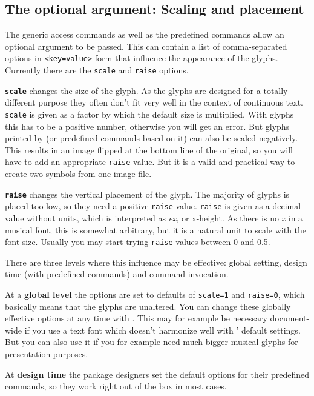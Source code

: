 \documentclass{article}
\begin{document}
\subsection{The optional argument: Scaling and placement}
\label{subsec:optional_argument}
The generic access commands as well as the predefined commands allow an optional argument to be passed.
This can contain a list of comma-separated options in \texttt{<key=value>} form that influence the appearance of the glyphs. Currently there are the \texttt{scale} and \texttt{raise} options.

\medskip
\texttt{\textbf{scale}} changes the size of the glyph. 
As the \emmentaler glyphs are designed for a totally different purpose they often don't fit very well in the context of continuous text.
\texttt{scale} is given as a factor by which the default size is multiplied.
With \emmentaler glyphs this has to be a positive number, otherwise you will get an error.
But glyphs printed by  (or predefined commands based on it) can also be scaled negatively.
This results in an image flipped at the bottom line of the original, so you will have to add an appropriate \texttt{raise} value.
But it is a valid and practical way to create two symbols from one image file.


\medskip
\texttt{\textbf{raise}} changes the vertical placement of the glyph.
The majority of glyphs is placed too low, so they need a positive \texttt{raise} value.
\texttt{raise} is given as a decimal value without units, which is interpreted as \emph{ex}, or x-height. 
As there is no \emph{x} in a musical font, this is somewhat arbitrary, but it is a natural unit to scale with the font size.
Usually you may start trying \texttt{raise} values between 0 and 0.5.

\medskip
There are three levels where this influence may be effective: global setting, design time (with predefined commands) and command invocation.

At a \textbf{global level} the options are set to defaults of \texttt{scale=1} and \texttt{raise=0}, which basically means that the glyphs are unaltered.
You can change these globally effective options at any time with .
This may for example be necessary document-wide if you use a text font which doesn't harmonize well with \lilyglyphs' default settings.
But you can also use it if you for example need much bigger musical glyphs for presentation purposes.

At \textbf{design time} the package designers set the default options for their predefined commands, so they work right out of the box in most cases.
\end{document}
